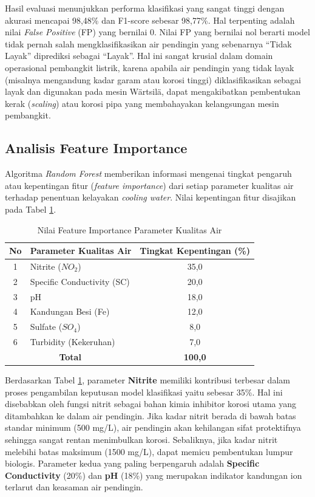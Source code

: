 Hasil evaluasi menunjukkan performa klasifikasi yang sangat tinggi dengan akurasi mencapai 98,48\% dan F1-score sebesar 98,77\%. Hal terpenting adalah nilai \textit{False Positive} (FP) yang bernilai 0. Nilai FP yang bernilai nol berarti model tidak pernah salah mengklasifikasikan air pendingin yang sebenarnya ``Tidak Layak'' diprediksi sebagai ``Layak''. Hal ini sangat krusial dalam domain operasional pembangkit listrik, karena apabila air pendingin yang tidak layak (misalnya mengandung kadar garam atau korosi tinggi) diklasifikasikan sebagai layak dan digunakan pada mesin W{\"a}rtsil{\"a}, dapat mengakibatkan pembentukan kerak (\textit{scaling}) atau korosi pipa yang membahayakan kelangsungan mesin pembangkit.

\subsection{Analisis Feature Importance}
Algoritma \textit{Random Forest} memberikan informasi mengenai tingkat pengaruh atau kepentingan fitur (\textit{feature importance}) dari setiap parameter kualitas air terhadap penentuan kelayakan \textit{cooling water}. Nilai kepentingan fitur disajikan pada Tabel \ref{tab:feature-importance}.

\begin{table}[htbp]
    \centering
    \caption{Nilai Feature Importance Parameter Kualitas Air}
    \label{tab:feature-importance}
    \fontsize{10pt}{12pt}\selectfont
    \begin{tabular}{|c|l|c|}
        \hline
        \textbf{No} & \textbf{Parameter Kualitas Air} & \textbf{Tingkat Kepentingan (\%)} \\
        \hline
        1 & Nitrite ($NO_2$) & 35,0 \\
        \hline
        2 & Specific Conductivity (SC) & 20,0 \\
        \hline
        3 & pH & 18,0 \\
        \hline
        4 & Kandungan Besi (Fe) & 12,0 \\
        \hline
        5 & Sulfate ($SO_4$) & 8,0 \\
        \hline
        6 & Turbidity (Kekeruhan) & 7,0 \\
        \hline
        \multicolumn{2}{|c|}{\textbf{Total}} & \textbf{100,0} \\
        \hline
    \end{tabular}
\end{table}

Berdasarkan Tabel \ref{tab:feature-importance}, parameter \textbf{Nitrite} memiliki kontribusi terbesar dalam proses pengambilan keputusan model klasifikasi yaitu sebesar 35\%. Hal ini disebabkan oleh fungsi nitrit sebagai bahan kimia inhibitor korosi utama yang ditambahkan ke dalam air pendingin. Jika kadar nitrit berada di bawah batas standar minimum (500 mg/L), air pendingin akan kehilangan sifat protektifnya sehingga sangat rentan menimbulkan korosi. Sebaliknya, jika kadar nitrit melebihi batas maksimum (1500 mg/L), dapat memicu pembentukan lumpur biologis. Parameter kedua yang paling berpengaruh adalah \textbf{Specific Conductivity} (20\%) dan \textbf{pH} (18\%) yang merupakan indikator kandungan ion terlarut dan keasaman air pendingin.

